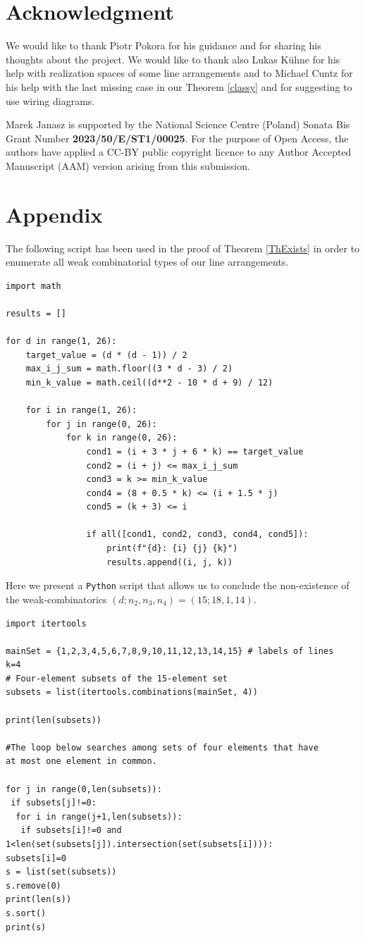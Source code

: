 \documentclass[12pt]{article}
\theoremstyle{plain}
\theoremstyle{definition}
\begin{document}
\section*{Acknowledgment}
We would like to thank Piotr Pokora for his guidance and for sharing his thoughts about the project.
We would like to thank also Lukas K\"uhne for his help with realization spaces of some line arrangements and to Michael Cuntz for his help with the last missing case in our Theorem \ref{classy} and for suggesting to use wiring diagrams.

Marek Janasz is supported by the National Science Centre (Poland) Sonata Bis Grant Number 
\textbf{2023/50/E/ST1/00025}. For the purpose of Open Access, the authors have applied a CC-BY public copyright licence to any Author Accepted Manuscript (AAM) version arising from this submission.
\newpage
\section*{Appendix}
The following script has been used in the proof of Theorem 
\ref{ThExists} in order to enumerate all weak combinatorial 
types of our line arrangements.

\begin{verbatim}
import math

results = []

for d in range(1, 26):
    target_value = (d * (d - 1)) / 2
    max_i_j_sum = math.floor((3 * d - 3) / 2)
    min_k_value = math.ceil((d**2 - 10 * d + 9) / 12)

    for i in range(1, 26):
        for j in range(0, 26):
            for k in range(0, 26):
                cond1 = (i + 3 * j + 6 * k) == target_value
                cond2 = (i + j) <= max_i_j_sum
                cond3 = k >= min_k_value
                cond4 = (8 + 0.5 * k) <= (i + 1.5 * j)
                cond5 = (k + 3) <= i

                if all([cond1, cond2, cond3, cond4, cond5]):
                    print(f"{d}: {i} {j} {k}")
                    results.append((i, j, k))    
\end{verbatim}

Here we present a \verb}Python} script that allows us to conclude the non-existence of the weak-combinatorics $(d;n_{2},n_{3}, n_{4}) = (15;18,1,14)$.
\begin{verbatim}
import itertools
 
mainSet = {1,2,3,4,5,6,7,8,9,10,11,12,13,14,15} # labels of lines
k=4 
# Four-element subsets of the 15-element set
subsets = list(itertools.combinations(mainSet, 4)) 

print(len(subsets))
 
#The loop below searches among sets of four elements that have 
at most one element in common.

for j in range(0,len(subsets)): 
 if subsets[j]!=0:
  for i in range(j+1,len(subsets)):
   if subsets[i]!=0 and 1<len(set(subsets[j]).intersection(set(subsets[i]))):
subsets[i]=0
s = list(set(subsets))
s.remove(0)
print(len(s))
s.sort()
print(s)  
\end{verbatim}
\end{document}
